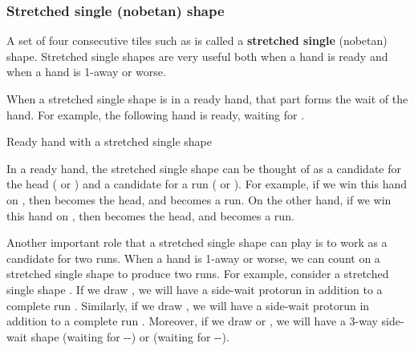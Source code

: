 {\subsubsection{Stretched single ({\jap nobetan}) shape} \label{sec:nobetan}
A set of four consecutive tiles such as {\LARGE{}} is called a {\bf stretched single} ({\jap nobetan}) shape. Stretched single shapes are very useful both when a hand is ready and when a hand is 1-away or worse. 

\bigskip
When a stretched single shape is in a ready hand, that part forms the wait of the hand. For example, the following hand is ready, waiting for {\LARGE{} }.
\bigskip
\begin{itembox}[r]{Ready hand with a stretched single shape}
\bp
{}\zhong\zhong\zhong
\ep 
\end{itembox}
In a ready hand, the stretched single shape can be thought of as a candidate for the head ({\LARGE{}} or {\LARGE{}}) and a candidate for a run ({\LARGE{}} or {\LARGE{}}). For example, if we win this hand on {\LARGE{}}, then {\LARGE{}} becomes the head, and {\LARGE{}} becomes a run. On the other hand, if we win this hand on {\LARGE{}}, then {\LARGE{}} becomes the head, and {\LARGE{}} becomes a run. 

\bigskip

Another important role that a stretched single shape can play is to work as a candidate for two runs. When a hand is 1-away or worse, we can count on a stretched single shape to produce two runs. 
For example, consider a stretched single shape {\LARGE{}}. 
If we draw {\LARGE{}}, we will have a side-wait protorun {\LARGE{}} in addition to a complete run {\LARGE{}}. Similarly, if we draw {\LARGE{}}, we will have a side-wait protorun {\LARGE{}} in addition to a complete run {\LARGE{}}. Moreover, if we draw {\LARGE{}} or {\LARGE{}}, we will have a 3-way side-wait shape {\LARGE{}} (waiting for {\LARGE{}--}) or {\LARGE{}} (waiting for {\LARGE{}--}). 

}
